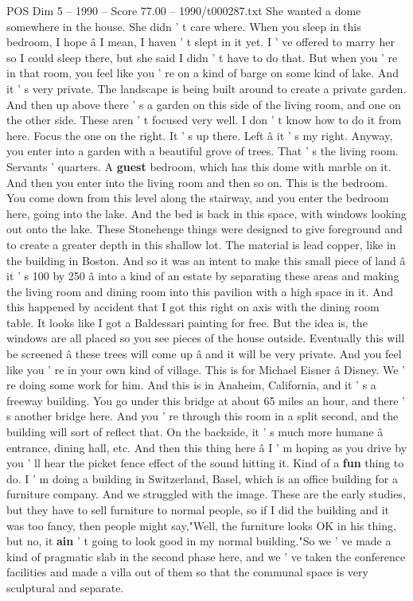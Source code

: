 \begin{textsample}{POS Dim 5 – 1990 – Score 77.00 – 1990/t000287.txt}
She wanted a dome somewhere in the house.
She didn ' t care where.
When you sleep in this bedroom, I hope â I mean, I haven ' t slept in it yet.
I ' ve offered to marry her so I could sleep there, but she said I didn ' t have to do that.
But when you ' re in that room, you feel like you ' re on a kind of barge on some kind of lake.
And it ' s very private.
The landscape is being built around to create a private garden.
And then up above there ' s a garden on this side of the living room, and one on the other side.
These aren ' t focused very well.
I don ' t know how to do it from here.
Focus the one on the right.
It ' s up there.
Left â it ' s my right.
Anyway, you enter into a garden with a beautiful grove of trees.
That ' s the living room.
Servants ' quarters.
A \textbf{guest} bedroom, which has this dome with marble on it.
And then you enter into the living room and then so on.
This is the bedroom.
You come down from this level along the stairway, and you enter the bedroom here, going into the lake.
And the bed is back in this space, with windows looking out onto the lake.
These Stonehenge things were designed to give foreground and to create a greater depth in this shallow lot.
The material is lead copper, like in the building in Boston.
And so it was an intent to make this small piece of land â it ' s 100 by 250 â into a kind of an estate by separating these areas and making the living room and dining room into this pavilion with a high space in it.
And this happened by accident that I got this right on axis with the dining room table.
It looks like I got a Baldessari painting for free.
But the idea is, the windows are all placed so you see pieces of the house outside.
Eventually this will be screened â these trees will come up â and it will be very private.
And you feel like you ' re in your own kind of village.
This is for Michael Eisner â Disney.
We ' re doing some work for him.
And this is in Anaheim, California, and it ' s a freeway building.
You go under this bridge at about 65 miles an hour, and there ' s another bridge here.
And you ' re through this room in a split second, and the building will sort of reflect that.
On the backside, it ' s much more humane â entrance, dining hall, etc.
And then this thing here â I ' m hoping as you drive by you ' ll hear the picket fence effect of the sound hitting it.
Kind of a \textbf{fun} thing to do.
I ' m doing a building in Switzerland, Basel, which is an office building for a furniture company.
And we struggled with the image.
These are the early studies, but they have to sell furniture to normal people, so if I did the building and it was too fancy, then people might say,"Well, the furniture looks OK in his thing, but no, it \textbf{ain} ' t going to look good in my normal building."So we ' ve made a kind of pragmatic slab in the second phase here, and we ' ve taken the conference facilities and made a villa out of them so that the communal space is very sculptural and separate.

\end{textsample}

